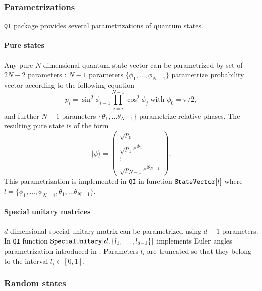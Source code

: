 \documentclass[11pt,a4paper]{article}
\newcommand{\qi}{\texttt{QI}}
\newcommand{\ket}[1]{\ensuremath{|#1\rangle}}
\newcommand{\1}{{\bf 1}}
\newcommand{\ii}{\mathrm{i}}
\newcommand{\fname}[1]{\text{\texttt{#1}}}
\begin{document}
\subsubsection{Parametrizations}
\qi{} package provides several parametrizations of quantum states. 

\paragraph{Pure states}
Any pure $N$-dimensional quantum state vector can be parametrized by set of 
$2N-2$ parameters \cite{vedra98entanglement}: $N-1$ parameters $\{\phi_1, 
\ldots, 
\phi_{N-1}\}$ parametrize probability vector according to the following equation
\begin{equation}
p_i=\sin^2\phi_{i-1} \prod\limits_{j=i}^{N-1}\cos^2\phi_j\text{\ \ with 
}\phi_0=\pi/2,
\end{equation}
and further $N-1$ parameters $\{\theta_1, \ldots
\theta_{N-1}\}$ parametrize relative phases. The resulting pure state 
is of the form
\begin{equation}
\ket{\psi}=
\left(
\begin{array}{c}
\sqrt{p_0}\\
\sqrt{p_1}e^{\ii \theta_1}\\
\vdots\\
\sqrt{p_{N-1}}e^{\ii \theta_{N-1}}
\end{array}
\right).
\end{equation}
This parametrization is implemented in \qi{} in function
$\fname{StateVector}[l]$ where $l=\{\phi_1, \ldots, \phi_{N-1}, \theta_1, \ldots
\theta_{N-1}\}$.

\paragraph{Special unitary matrices}
$d$-dimensional special unitary matrix can be parametrized using 
$d-1$-parameters. In \qi{} function 
$\fname{SpecialUnitary}[d,\{l_1,\ldots,l_{d-1}\}]$ 
implements Euler angles parametrization introduced in 
\cite{zyczkowski94random}. Parameters $l_i$ are 
truncated so that they belong to the interval $l_i\in [0,1]$.
\subsubsection{Random states}
\end{document}
